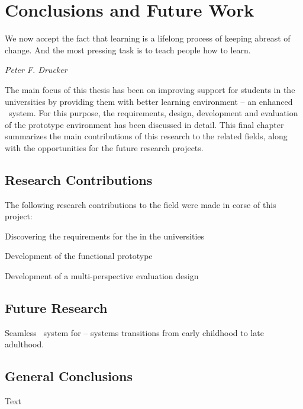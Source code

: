 \chapter{Conclusions and Future Work\label{cha:conclusion}}
\epigraph{We now accept the fact that learning is a lifelong process of keeping
abreast of change. And the most pressing task is to teach people how to
learn.}{\textit{Peter F. Drucker}}

The main focus of this thesis has been on improving \LLLs support for students
in the universities by providing them with better learning environment -- an
enhanced \ep~system. For this purpose, the requirements, design, development and
evaluation of the prototype environment has been discussed in detail. This final
chapter summarizes the main contributions of this research to the related
fields, along with the opportunities for the future research projects.

\section{Research Contributions}

The following research contributions to the field were made in corse of this
project:

Discovering the requirements for the \LLLs in the universities

Development of the functional prototype

Development of a multi-perspective evaluation design

\section{Future Research}


Seamless \ep~system for \LLLs -- systems transitions from early childhood to
late adulthood.

\section{General Conclusions}

Text